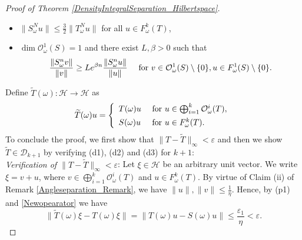 \documentclass[pdflatex,sn-mathphys-num]{sn-jnl}%
\theoremstyle{thmstyleone}%
\theoremstyle{thmstyletwo}%
\theoremstyle{thmstylethree}%
\newcommand{\cH}{\mathcal{H}}
\newcommand{\eps}{\varepsilon}
\numberwithin{equation}{section}
\begin{document}
\begin{proof}[Proof of Theorem \ref{DensityIntegralSeparation_Hilbertspace}]
\begin{itemize}
    \item [(p2)] $\|S^N_{\omega}u\|\leq \frac{3}{2}\|T^N_{\omega}u\|$ for all $u\in F_{\omega}^k(T)$,
    \item [(p3)]$\dim \mathcal O^1_{\omega}(S)=1$ and there exist $L,\beta>0$ such that 
\begin{equation}\label{PropertyP2}
\frac{\|S^n_{\omega}v\|}{\|v\|} \geq L e^{\beta n}   \frac{\|S^n_{\omega}u\|}{\|u\|} \quad\hbox{ for } v\in \mathcal O^1_{\omega}(S)\setminus\{0\}, u\in  F^1_{\omega}(S)\setminus\{0\}.
\end{equation}
\end{itemize}
Define $\widetilde T(\omega):\cH\rightarrow \cH$ as 
\begin{equation}\label{Newopearator}
\widetilde T(\omega)u
=
\left\{
\begin{array}{ll}
    T(\omega) u & \hbox{ for } u\in \bigoplus_{i=1}^k\mathcal O^i_{\omega}(T),  \\[1ex]
     S(\omega) u &  \hbox{ for } u\in F^{k}_{\omega}(T).
\end{array}
\right.
\end{equation}
To conclude the proof, we first show that $\|T-\widetilde T\|_{\infty}<\eps$ and then we show $\widetilde T\in \mathcal D_{k+1}$ by verifying (d1), (d2) and (d3) for $k+1$:\\

\noindent 
\emph{Verification of $\|T-\widetilde T\|_{\infty}<\eps$}: Let $\xi\in \cH$ be an arbitrary unit vector. We write $\xi=v+u$, where  $v\in \bigoplus_{i=1}^k\mathcal O^i_{\omega}(T)$ and $u\in F^{k}_{\omega}(T)$. By virtue of Claim (ii) of Remark \ref{Angleseparation_Remark}, we have $\|u\|, \|v\|\leq \frac{1}{\eta}$. Hence, by (p1) and \eqref{Newopearator} we have 
\[
\|\widetilde T(\omega) \xi- T(\omega)\xi\|
=
\|T(\omega)u-S(\omega)u\|
\leq \frac{\eps_1}{\eta}<\eps.  
\]


\end{proof}
\end{document}
